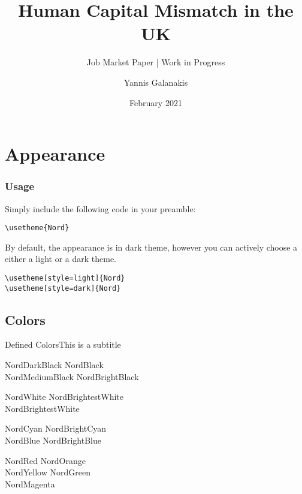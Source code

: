 \documentclass[compress,aspectratio=169, table]{beamer}
\title[HCM in the UK]{Human Capital Mismatch in the UK}
\subtitle{Job Market Paper | Work in Progress}
\author{Yannis Galanakis}
\institute{University of Kent}
\date{February 2021}
\begin{document}
\begin{frame}
  \maketitle
\end{frame}


\section{Appearance}

\begin{frame}[fragile]
  \frametitle{Usage}
  Simply include the following code in your preamble:

  \begin{lstlisting}[basicstyle = \ttfamily\small]
\usetheme{Nord}
  \end{lstlisting}

  \bigskip

  By default, the appearance is in dark theme, however you can actively choose a either a light or a
  dark theme.

  \begin{lstlisting}[basicstyle = \ttfamily\small]
\usetheme[style=light]{Nord}
\usetheme[style=dark]{Nord}
  \end{lstlisting}

\end{frame}

\subsection{Colors}

\begin{frame}{Defined Colors}{This is a subtitle}
  \begin{description}
  \item[Polar Night]
    \textcolor{NordDarkBlack}{NordDarkBlack} \quad \textcolor{NordBlack}{NordBlack}\\
    \textcolor{NordMediumBlack}{NordMediumBlack} \quad \textcolor{NordBrightBlack}{NordBrightBlack}
  \item[Snow Storm]
    \textcolor{NordWhite}{NordWhite} \quad \textcolor{NordBrighterWhite}{NordBrightestWhite}\\
    \textcolor{NordBrightestWhite}{NordBrightestWhite}
  \item[Forest]
    \textcolor{NordCyan}{NordCyan} \quad \textcolor{NordBrightCyan}{NordBrightCyan}\\
    \textcolor{NordBlue}{NordBlue} \quad \textcolor{NordBrightBlue}{NordBrightBlue}
  \item[Aurora]
    \textcolor{NordRed}{NordRed} \quad \textcolor{NordOrange}{NordOrange} \\
    \textcolor{NordYellow}{NordYellow} \quad \textcolor{NordGreen}{NordGreen} \\
    \textcolor{NordMagenta}{NordMagenta}
  \end{description}
\end{frame}
\end{document}

